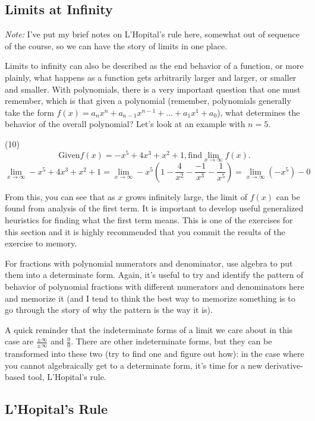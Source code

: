 \documentclass[12pt]{amsart}
\begin{document}
\subsection{Limits at Infinity}
{\it Note:} I've put my brief notes on L'Hopital's rule here, somewhat out of sequence of the course, so we can have the story of limits in one place.

Limits to infinity can also be described as the end behavior of a function, or more plainly, what happens as a function gets arbitrarily larger and larger, or smaller and smaller. With polynomials, there is a very important question that one must remember, which is that given a polynomial (remember, polynomials generally take the form $f(x) = a_{n}x^n + a_{n-1}x^{n-1} + \dots + a_{1}x^1 + a_0$), what determines the behavior of the overall polynomial? Let's look at an example with $n=5$.

(10) 	$$\text{Given} f(x) = -x^5 + 4x^3 + x^2 + 1, \text{find} \lim_{x \to \infty} f(x).$$
	$$\lim_{x \to \infty} -x^5 + 4x^3 + x^2 + 1 = \lim_{x \to \infty} -x^5(1 - \frac{4}{x^2} - \frac{-1}{x^3} - \frac{1}{x^5}) = \lim_{x \to \infty}(-x^5) - 0$$

From this, you can see that as $x$ grows infinitely large, the limit of $f(x)$ can be found from analysis of the first term. It is important to develop useful generalized heuristics for finding what the first term means. This is one of the exercises for this section and it is highly recommended that you commit the results of the exercise to memory.

For fractions with polynomial numerators and denominator, use algebra to put them into a determinate form. Again, it's useful to try and identify the pattern of behavior of polynomial fractions with different numerators and denominators here and memorize it (and I tend to think the best way to memorize something is to go through the story of why the pattern is the way it is). 

A quick reminder that the indeterminate forms of a limit we care about in this case are $\frac{\pm\infty}{\pm\infty}$ and $\frac{0}{0}$. There are other indeterminate forms, but they can be transformed into these two (try to find one and figure out how): in the case where you cannot algebraically get to a determinate form, it's time for a new derivative-based tool, L'Hopital's rule.

\subsection{L'Hopital's Rule}
\end{document}
